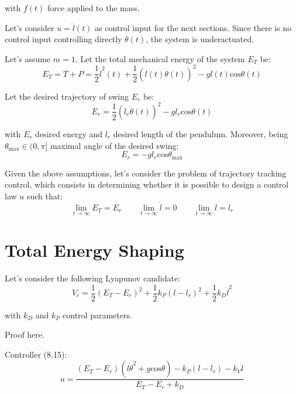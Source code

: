 \documentclass[a4paper]{article}
\begin{document}
\noindent with $f(t)$ force applied to the mass.

Let's consider $u = \ddot{l}(t)$ as control input for the next sections. Since 
there is no control input controlling directly $\theta(t)$, the system is
underactuated.

Let's assume $m=1$. Let the total mechanical energy of the system $E_T$ be:
\begin{equation}
  E_T = T + P
      = \frac{1}{2}\dot{l}^2(t) + \frac{1}{2}(l(t)\dot{\theta}(t))^2
        - g l(t) \text{cos}\theta(t)
\end{equation}

Let the desired trajectory of swing $E_r$ be:
\begin{equation}
  E_r = \frac{1}{2}(l_r \dot{\theta}(t))^2 - g l_r \text{cos} \theta(t)
\end{equation}

\noindent with $E_r$ desired energy and $l_r$ desired length of the pendulum.
Moreover, being $\theta_{\text{max}} \in (0, \pi]$ maximal angle of the desired swing:
\begin{equation}
  E_r = -g l_r \text{cos}\theta_{\text{max}}
\end{equation}

Given the above assumptions, let's consider the problem of trajectory tracking
control, which consists in determining whether it is possible to design a
control law $u$ such that:
\begin{equation}
  \lim_{t\to\infty} E_T = E_r \qquad
  \lim_{t\to\infty} \dot{l} = 0 \qquad
  \lim_{t\to\infty} l = l_r 
\end{equation}

\section{Total Energy Shaping}
Let's consider the following Lyapunov candidate:
\begin{equation}
  V_c = \frac{1}{2} (E_T - E_r)^2 +
        \frac{1}{2} k_P (l - l_r)^2 +
        \frac{1}{2} k_D \dot{l}^2
\end{equation}

\noindent with $k_D$ and $k_P$ control parameters.

Proof here.

Controller (8.15):
\begin{equation}
  u = \frac{(E_T - E_r)(l\dot{\theta}^2 + g\text{cos}\theta) - k_P(l-l_r)
    - k_V \dot{l}}{E_T - E_r + k_D}
\end{equation}
\end{document}
